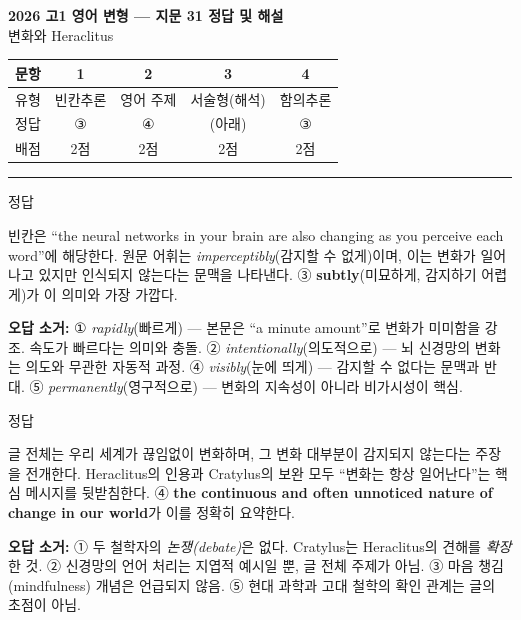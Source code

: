 \documentclass[11pt,a4paper]{article}
\newcommand{\sol}[2]{\vspace{6pt}{\sffamily\bfseries #1} \quad 정답 \fbox{#2}\par\vspace{1pt}}
\begin{document}
\begin{center}
{\fontsize{15}{17}\selectfont\sffamily\bfseries 2026 고1 영어 변형 — 지문 31 정답 및 해설}\\[2pt]
{\sffamily 변화와 Heraclitus}
\end{center}
\vspace{6pt}

\begin{center}
\renewcommand{\arraystretch}{1.4}
\begin{tabular}{|c|c|c|c|c|}
\hline
\sffamily 문항 & 1 & 2 & 3 & 4 \\\hline
\sffamily 유형 & \sffamily 빈칸추론 & \sffamily 영어 주제 & \sffamily 서술형(해석) & \sffamily 함의추론 \\\hline
\sffamily 정답 & ③ & ④ & (아래) & ③ \\\hline
\sffamily 배점 & 2점 & 2점 & 2점 & 2점 \\\hline
\end{tabular}
\end{center}
\vspace{8pt}\hrule\vspace{4pt}

\sol{1. 빈칸추론}{③}
빈칸은 ``the neural networks in your brain are also \underline{\hspace{2cm}} changing as you perceive each word''에 해당한다.
원문 어휘는 \textit{imperceptibly}(감지할 수 없게)이며, 이는 변화가 일어나고 있지만 인식되지 않는다는 문맥을 나타낸다.
③ \textbf{subtly}(미묘하게, 감지하기 어렵게)가 이 의미와 가장 가깝다.
\par\vspace{2pt}
\textbf{오답 소거:}
① \textit{rapidly}(빠르게) — 본문은 ``a minute amount''로 변화가 미미함을 강조. 속도가 빠르다는 의미와 충돌.
② \textit{intentionally}(의도적으로) — 뇌 신경망의 변화는 의도와 무관한 자동적 과정.
④ \textit{visibly}(눈에 띄게) — 감지할 수 없다는 문맥과 반대.
⑤ \textit{permanently}(영구적으로) — 변화의 지속성이 아니라 비가시성이 핵심.

\sol{2. 영어 주제}{④}
글 전체는 우리 세계가 끊임없이 변화하며, 그 변화 대부분이 감지되지 않는다는 주장을 전개한다.
Heraclitus의 인용과 Cratylus의 보완 모두 ``변화는 항상 일어난다''는 핵심 메시지를 뒷받침한다.
④ \textbf{the continuous and often unnoticed nature of change in our world}가 이를 정확히 요약한다.
\par\vspace{2pt}
\textbf{오답 소거:}
① 두 철학자의 \textit{논쟁(debate)}은 없다. Cratylus는 Heraclitus의 견해를 \textit{확장}한 것.
② 신경망의 언어 처리는 지엽적 예시일 뿐, 글 전체 주제가 아님.
③ 마음 챙김(mindfulness) 개념은 언급되지 않음.
⑤ 현대 과학과 고대 철학의 확인 관계는 글의 초점이 아님.
\end{document}
